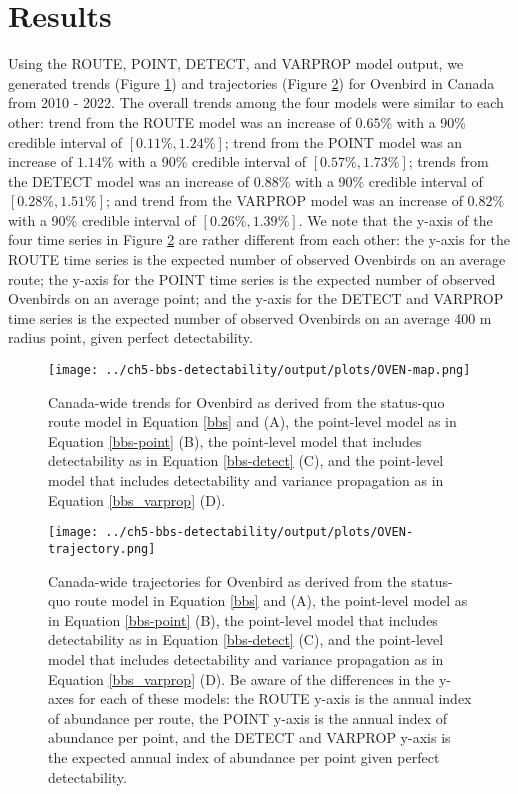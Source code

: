 \section{Results}

\par Using the ROUTE, POINT, DETECT, and VARPROP model output, we generated trends (Figure \ref{fig:oven-map}) and trajectories (Figure \ref{fig:oven-trajectories}) for Ovenbird in Canada from 2010 - 2022.
The overall trends among the four models were similar to each other: trend from the ROUTE model was an increase of $0.65\%$ with a 90\% credible interval of $[0.11\%, 1.24\%]$; trend from the POINT model was an increase of $1.14\%$ with a 90\% credible interval of $[0.57\%, 1.73\%]$; trends from the DETECT model was an increase of $0.88\%$ with a 90\% credible interval of $[0.28\%, 1.51\%]$; and trend from the VARPROP model was an increase of $0.82\%$ with a 90\% credible interval of $[0.26\%, 1.39\%]$.
We note that the y-axis of the four time series in Figure \ref{fig:oven-trajectories} are rather different from each other: the y-axis for the ROUTE time series is the expected number of observed Ovenbirds on an average route; the y-axis for the POINT time series is the expected number of observed Ovenbirds on an average point; and the y-axis for the DETECT and VARPROP time series is the expected number of observed Ovenbirds on an average 400 m radius point, given perfect detectability.

\begin{figure}[h]
	\texttt{[image: ../ch5-bbs-detectability/output/plots/OVEN-map.png]}
	\caption{Canada-wide trends for Ovenbird as derived from the status-quo route model in Equation \ref{bbs} and \citet{smith_spatially_2023} (A), the point-level model as in Equation \ref{bbs-point} (B), the point-level model that includes detectability as in Equation \ref{bbs-detect} (C), and the point-level model that includes detectability and variance propagation as in Equation \ref{bbs_varprop} (D).}
	\label{fig:oven-map}
\end{figure}

\begin{figure}[h]
	\texttt{[image: ../ch5-bbs-detectability/output/plots/OVEN-trajectory.png]}
	\caption{Canada-wide trajectories for Ovenbird as derived from the status-quo route model in Equation \ref{bbs} and \citet{smith_spatially_2023} (A), the point-level model as in Equation \ref{bbs-point} (B), the point-level model that includes detectability as in Equation \ref{bbs-detect} (C), and the point-level model that includes detectability and variance propagation as in Equation \ref{bbs_varprop} (D). Be aware of the differences in the y-axes for each of these models: the ROUTE y-axis is the annual index of abundance per route, the POINT y-axis is the annual index of abundance per point, and the DETECT and VARPROP y-axis is the expected annual index of abundance per point given perfect detectability.}
	\label{fig:oven-trajectories}
\end{figure}


